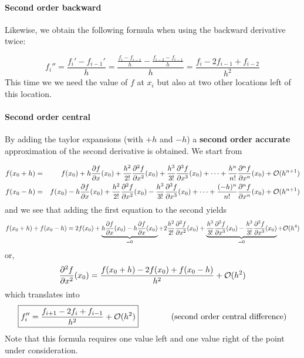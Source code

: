 \paragraph{Second order backward}
Likewise, we obtain the following formula when using the backward derivative twice:

\begin{equation}
f_{i}'' 
= \frac{f_{i}'-f_{i-1}'}{h} 
= \frac{\frac{f_{i}-f_{i-1}}{h}- \frac{f_{i-2}-f_{i-1}}{h}  }{h} 
= \frac{f_{i}-2f_{i-1}+f_{i-2}}{h^2} 
\end{equation}
This time we  we need the value of $f$ at $x_i$ but also at two 
other locations left of this location.

\paragraph{Second order central} 
By adding the taylor expansions (with $+h$ and $-h$) 
a {\bf second order accurate}  approximation of the second derivative is obtained.
We start from 

\begin{eqnarray}
f(x_0+h)&=&f(x_0)+ 
h \frac{\partial f}{\partial x}(x_0)  + 
\frac{h^2}{2!} \frac{\partial^2 f}{\partial x^2}(x_0)  +
\frac{h^3}{3!} \frac{\partial^3 f}{\partial x^3}(x_0)  +
\dots  +
\frac{h^n}{n!} \frac{\partial^n f}{\partial x^n}(x_0)  
+ {\cal O}(h^{n+1}) 
\nonumber\\
f(x_0-h)&=&f(x_0) 
-h \frac{\partial f}{\partial x}(x_0)  + 
\frac{h^2}{2!} \frac{\partial^2 f}{\partial x^2}(x_0)  -
\frac{h^3}{3!} \frac{\partial^3 f}{\partial x^3}(x_0)  +
\dots  +
\frac{(-h)^n}{n!} \frac{\partial^n f}{\partial x^n}(x_0)  
+ {\cal O}(h^{n+1}) \nonumber
\end{eqnarray}
and we see that adding the first equation to the second yields
\begin{equation}
f(x_0+h) + f(x_0-h) =2 f(x_0)+ 
\underbrace{h \frac{\partial f}{\partial x}(x_0)   
-h \frac{\partial f}{\partial x}(x_0)}_{=0}  + 
2\frac{h^2}{2!} \frac{\partial^2 f}{\partial x^2}(x_0)  
+
\underbrace{
\frac{h^3}{3!} \frac{\partial^3 f}{\partial x^3}(x_0)  
-\frac{h^3}{3!} \frac{\partial^3 f}{\partial x^3}(x_0)  
}_{=0}
+ {\cal O}(h^{4})
\end{equation}
or, 
\begin{equation}
\frac{\partial^2 f}{\partial x^2}(x_0)  =
\frac{f(x_0+h) -2f(x_0) + f(x_0-h) }{h^2}
+ {\cal O}(h^2)
\end{equation}
which translates into
\begin{equation}
\boxed{
f_{i}''=\frac{f_{i+1}-2f_i+f_{i-1}}{h^2} + {\cal O}(h^2)
}
\qquad
\qquad
\text{(second order central difference)}
\end{equation}
Note that this formula requires one value left and one value right of the point 
under consideration. 

